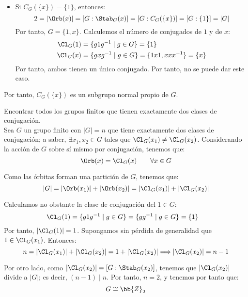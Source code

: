 \begin{ejercicio}
\begin{itemize}
        \item Si $C_G(\{x\}) = \{1\}$, entonces:
        \begin{equation*}
            2 = |\Orb(x)| = [G:\Stab_G(x)] = [G:C_G(\{x\})] = [G:\{1\}] = |G|
        \end{equation*}
        Por tanto, $G=\{1,x\}$. Calculemos el número de conjugados de $1$ y de $x$:
        \begin{align*}
            \Cl_G(1) &= \{g1g^{-1} \mid g \in G\} = \{1\} \\
            \Cl_G(x) &= \{gxg^{-1} \mid g \in G\} = \{1x1, xxx^{-1}\} = \{x\}
        \end{align*}
        Por tanto, ambos tienen un único conjugado. Por tanto, no se puede dar este caso.
    \end{itemize}
    Por tanto, $C_G(\{x\})$ es un subgrupo normal propio de $G$.
\end{ejercicio}

\begin{ejercicio}\label{ej:6.5}
    Encontrar todos los grupos finitos que tienen exactamente dos clases de conjugación.\\

    Sea $G$ un grupo finito con $|G| = n$ que tiene exactamente dos clases de conjugación; a saber, $\exists x_1, x_2 \in G$ tales que $\Cl_G(x_1) \neq \Cl_G(x_2)$. Considerando la acción de $G$ sobre sí mismo por conjugación, tenemos que:
    \begin{equation*}
        \Orb(x) = \Cl_G(x) \qquad \forall x \in G
    \end{equation*}

    Como las órbitas forman una partición de $G$, tenemos que:
    \begin{equation*}
        |G| = |\Orb(x_1)| + |\Orb(x_2)| = |\Cl_G(x_1)| + |\Cl_G(x_2)|
    \end{equation*}

    Calculamos no obstante la clase de conjugación del $1\in G$:
    \begin{align*}
        \Cl_G(1) &= \{g1g^{-1} \mid g \in G\} = \{g g^{-1} \mid g \in G\} = \{1\}
    \end{align*}
    Por tanto, $|\Cl_G(1)| = 1$. Supongamos sin pérdida de generalidad que $1\in \Cl_G(x_1)$. Entonces:
    \begin{equation*}
        n = |\Cl_G(x_1)| + |\Cl_G(x_2)| = 1 + |\Cl_G(x_2)|
        \Longrightarrow |\Cl_G(x_2)| = n - 1
    \end{equation*}

    Por otro lado, como $|\Cl_G(x_2)| = [G:\Stab_G(x_2)]$, tenemos que $|\Cl_G(x_2)|$ divide a $|G|$; es decir, $(n-1) \mid n$. Por tanto, $n=2$, y tenemos por tanto que:
    \begin{equation*}
        G\cong \bb{Z}_2
    \end{equation*}
\end{ejercicio}

